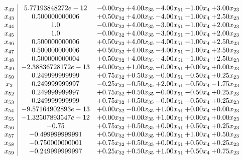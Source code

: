 \documentclass[8pt]{article}
\begin{document}
\[\begin{array}{c| c c@{\hskip 2pt} c@{\hskip 2pt} c@{\hskip 2pt} c@{\hskip 2pt} c@{\hskip 2pt} }
 x_{42}   &  5.77193848272e-12 & -0.00 x_{32} & +  4.00 x_{35} & -4.00 x_{51} & -1.00 x_{4} & +  3.00 x_{23}\\
 x_{43}   &  0.500000000006 & +  0.50 x_{32} & +  4.00 x_{35} & -4.00 x_{51} & -1.00 x_{4} & +  2.50 x_{23}\\
 x_{44}   &  1.0 & -0.00 x_{32} & +  4.00 x_{35} & -3.00 x_{51} & -1.00 x_{4} & +  2.00 x_{23}\\
 x_{45}   &  1.0 & -0.00 x_{32} & +  4.00 x_{35} & -3.00 x_{51} & -1.00 x_{4} & +  2.00 x_{23}\\
 x_{46}   &  0.500000000006 & +  0.50 x_{32} & +  4.00 x_{35} & -4.00 x_{51} & -1.00 x_{4} & +  2.50 x_{23}\\
 x_{47}   &  0.500000000006 & +  0.50 x_{32} & +  4.00 x_{35} & -4.00 x_{51} & -1.00 x_{4} & +  2.50 x_{23}\\
 x_{48}   &  0.500000000004 & +  0.50 x_{32} & +  4.00 x_{35} & -4.00 x_{51} & -1.00 x_{4} & +  2.50 x_{23}\\
 x_{49}   &  -2.38836728172e-13 & +  0.00 x_{32} & +  1.00 x_{35} & -0.00 x_{51} & +  0.00 x_{4} & +  0.00 x_{23}\\
 x_{50}   &  0.249999999999 & +  0.75 x_{32} & +  0.50 x_{35} & -0.00 x_{51} & -0.50 x_{4} & +  0.25 x_{23}\\
 x_{2}   &  0.249999999997 & -0.25 x_{32} & -0.50 x_{35} & +  2.00 x_{51} & -0.50 x_{4} & -1.75 x_{23}\\
 x_{52}   &  0.249999999997 & +  0.75 x_{32} & +  0.50 x_{35} & -0.00 x_{51} & -0.50 x_{4} & +  0.25 x_{23}\\
 x_{53}   &  0.249999999999 & +  0.75 x_{32} & +  0.50 x_{35} & -0.00 x_{51} & -0.50 x_{4} & +  0.25 x_{23}\\
 x_{54}   &  -9.57164902893e-13 & +  0.00 x_{32} & -0.00 x_{35} & +  1.00 x_{51} & +  0.00 x_{4} & +  0.00 x_{23}\\
 x_{55}   &  -1.32507893547e-12 & +  0.00 x_{32} & -0.00 x_{35} & +  1.00 x_{51} & +  0.00 x_{4} & +  0.00 x_{23}\\
 x_{56}   &  -0.75 & +  0.75 x_{32} & +  0.50 x_{35} & +  0.00 x_{51} & +  0.50 x_{4} & +  0.25 x_{23}\\
 x_{57}   &  -0.499999999991 & +  0.50 x_{32} & +  0.00 x_{35} & +  0.00 x_{51} & +  1.00 x_{4} & +  0.50 x_{23}\\
 x_{58}   &  -0.750000000001 & +  0.75 x_{32} & +  0.50 x_{35} & +  0.00 x_{51} & +  0.50 x_{4} & +  0.25 x_{23}\\
 x_{59}   &  -0.249999999997 & +  0.25 x_{32} & +  0.50 x_{35} & +  1.00 x_{51} & +  0.50 x_{4} & +  0.75 x_{23}\\

\end{array}\]
\end{document}
